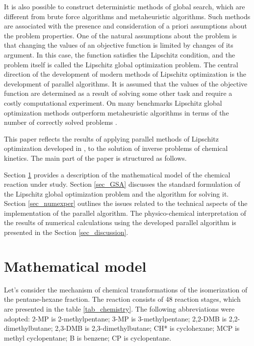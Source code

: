\documentclass[mathematics,article,submit,pdftex,moreauthors]{Definitions/mdpi}
\begin{document}
It is also possible to construct deterministic methods of global search, which are different from brute force algorithms and metaheuristic algorithms. Such methods are associated with the presence and consideration of a priori assumptions about the problem properties. 
One of the natural assumptions about the problem is that changing the values of an objective function is limited by changes of its argument. In this case, the function satisfies the Lipschitz condition, and the problem itself is called the Lipschitz global optimization problem. The central direction of the development of modern methods of Lipschitz optimization is the development of parallel algorithms. It is assumed that the values of the objective function are determined as a result of solving some other task and require a costly computational experiment.
\textcolor[rgb]{1,0,0}{On many benchmarks Lipschitz global optimization methods outperform metaheuristic algorithms in terms of the number of correctly solved problems \cite{Sergeyev2018,Sovrasov2019}.}


This paper reflects the results of applying parallel methods of Lipschitz optimization developed in \cite{Barkalov2016,Strongin2018,Sysoyev2017}, to the solution of inverse problems of chemical kinetics.  
The main part of the paper is structured as follows. 

Section \ref{sec_matmodel} provides a description of the mathematical model of the chemical reaction under study. Section \ref{sec_GSA} discusses the standard formulation of the Lipschitz global optimization problem and the algorithm for solving it. Section \ref{sec_numexper} outlines the issues related to the technical aspects of the implementation of the parallel algorithm. The physico-chemical interpretation of the results of numerical calculations using the developed parallel algorithm is presented in the Section \ref{sec_discussion}. 

\section{Mathematical model}\label{sec_matmodel}

Let's consider the mechanism of chemical transformations of the isomerization of the pentane-hexane fraction. The reaction consists of 48 reaction stages, which are presented in the table \ref{tab_chemistry}. The following abbreviations were adopted: 2-MP is 2-methylpentane; 3-MP is 3-methylpentane; 2,2-DMB is 2,2-dimethylbutane; 2,3-DMB is 2,3-dimethylbutane; CH* is cyclohexane; MCP is methyl cyclopentane; B is benzene; CP is cyclopentane.
\end{document}

